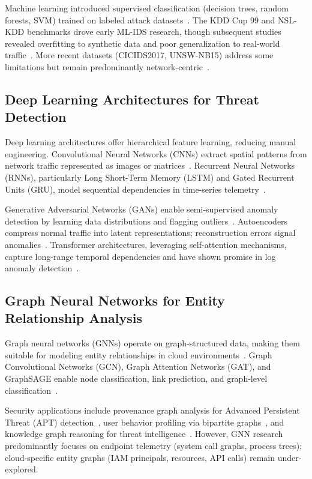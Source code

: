 Machine learning introduced supervised classification (decision trees, random forests, SVM) trained on labeled attack datasets~\cite{buczak2016survey}. The KDD Cup 99 and NSL-KDD benchmarks drove early ML-IDS research, though subsequent studies revealed overfitting to synthetic data and poor generalization to real-world traffic~\cite{tavallaee2009nslkdd}. More recent datasets (CICIDS2017, UNSW-NB15) address some limitations but remain predominantly network-centric~\cite{sharafaldin2018cicids}.

\subsection{Deep Learning Architectures for Threat Detection}
Deep learning architectures offer hierarchical feature learning, reducing manual engineering. Convolutional Neural Networks (CNNs) extract spatial patterns from network traffic represented as images or matrices~\cite{wang2017cnnids}. Recurrent Neural Networks (RNNs), particularly Long Short-Term Memory (LSTM) and Gated Recurrent Units (GRU), model sequential dependencies in time-series telemetry~\cite{staudemeyer2019lstmids}.

Generative Adversarial Networks (GANs) enable semi-supervised anomaly detection by learning data distributions and flagging outliers~\cite{zenati2018gananomalydetection}. Autoencoders compress normal traffic into latent representations; reconstruction errors signal anomalies~\cite{sakurada2014autoencoder}. Transformer architectures, leveraging self-attention mechanisms, capture long-range temporal dependencies and have shown promise in log anomaly detection~\cite{zhang2022logtransformer}.

\subsection{Graph Neural Networks for Entity Relationship Analysis}
Graph neural networks (GNNs) operate on graph-structured data, making them suitable for modeling entity relationships in cloud environments~\cite{wu2021gnnreview}. Graph Convolutional Networks (GCN), Graph Attention Networks (GAT), and GraphSAGE enable node classification, link prediction, and graph-level classification~\cite{velickovic2017gat,hamilton2017graphsage}.

Security applications include provenance graph analysis for Advanced Persistent Threat (APT) detection~\cite{milajerdi2019poirot}, user behavior profiling via bipartite graphs~\cite{wang2020gcnueba}, and knowledge graph reasoning for threat intelligence~\cite{pingle2019kgti}. However, GNN research predominantly focuses on endpoint telemetry (system call graphs, process trees); cloud-specific entity graphs (IAM principals, resources, API calls) remain under-explored.

